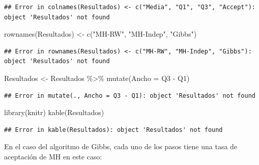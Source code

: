 \documentclass[
  12pt,
]{book}
\newenvironment{Shaded}{\begin{snugshade}}{\end{snugshade}}
\newcommand{\AttributeTok}[1]{\textcolor[rgb]{0.77,0.63,0.00}{#1}}
\newcommand{\FunctionTok}[1]{\textcolor[rgb]{0.00,0.00,0.00}{#1}}
\newcommand{\NormalTok}[1]{#1}
\newcommand{\OtherTok}[1]{\textcolor[rgb]{0.56,0.35,0.01}{#1}}
\newcommand{\SpecialCharTok}[1]{\textcolor[rgb]{0.00,0.00,0.00}{#1}}
\newcommand{\StringTok}[1]{\textcolor[rgb]{0.31,0.60,0.02}{#1}}
\begin{document}
\begin{verbatim}
## Error in colnames(Resultados) <- c("Media", "Q1", "Q3", "Accept"): object 'Resultados' not found
\end{verbatim}

\begin{Shaded}
\begin{Highlighting}[]
\FunctionTok{rownames}\NormalTok{(Resultados) }\OtherTok{\textless{}{-}} \FunctionTok{c}\NormalTok{(}\StringTok{"MH{-}RW"}\NormalTok{, }\StringTok{"MH{-}Indep"}\NormalTok{, }\StringTok{"Gibbs"}\NormalTok{)}
\end{Highlighting}
\end{Shaded}

\begin{verbatim}
## Error in rownames(Resultados) <- c("MH-RW", "MH-Indep", "Gibbs"): object 'Resultados' not found
\end{verbatim}

\begin{Shaded}
\begin{Highlighting}[]
\NormalTok{Resultados }\OtherTok{\textless{}{-}}\NormalTok{ Resultados }\SpecialCharTok{\%\textgreater{}\%}
    \FunctionTok{mutate}\NormalTok{(}\AttributeTok{Ancho =}\NormalTok{ Q3 }\SpecialCharTok{{-}}\NormalTok{ Q1)}
\end{Highlighting}
\end{Shaded}

\begin{verbatim}
## Error in mutate(., Ancho = Q3 - Q1): object 'Resultados' not found
\end{verbatim}

\begin{Shaded}
\begin{Highlighting}[]
\FunctionTok{library}\NormalTok{(knitr)}
\FunctionTok{kable}\NormalTok{(Resultados)}
\end{Highlighting}
\end{Shaded}

\begin{verbatim}
## Error in kable(Resultados): object 'Resultados' not found
\end{verbatim}

En el caso del algoritmo de Gibbs, cada uno de los pasos tiene una tasa
de aceptación de MH en este caso:

\begin{Shaded}
\end{Shaded}
\end{document}
